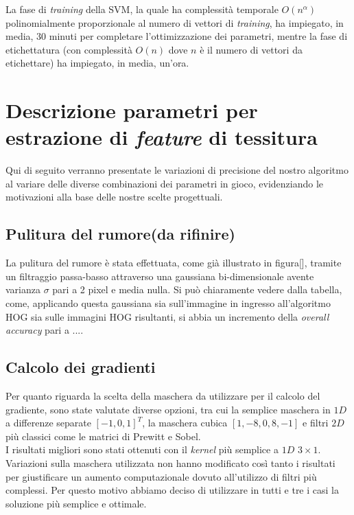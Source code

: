 La fase di \emph{training} della SVM, la quale ha complessità temporale $O(n^\alpha)$ polinomialmente proporzionale al numero di vettori di \emph{training}, ha impiegato, in media, 30 minuti per completare l'ottimizzazione dei parametri, mentre la fase di etichettatura (con complessità $O(n)$ dove $n$ è il numero di vettori da etichettare) ha impiegato, in media, un'ora.

%

\section{Descrizione parametri per estrazione di \emph{feature} di tessitura}
Qui di seguito verranno presentate le variazioni di precisione del nostro algoritmo al variare delle diverse combinazioni dei parametri in gioco, evidenziando le motivazioni alla base delle nostre scelte progettuali.

\subsection{Pulitura del rumore(da rifinire)}
La pulitura del rumore è stata effettuata, come già illustrato in figura[], tramite un filtraggio passa-basso attraverso una gaussiana bi-dimensionale avente varianza $\sigma$ pari a 2 pixel e media nulla. Si può chiaramente vedere dalla tabella, come, applicando questa gaussiana sia sull'immagine in ingresso all'algoritmo HOG sia sulle immagini HOG risultanti, si abbia un incremento della \emph{overall accuracy} pari a ....

\subsection{Calcolo dei gradienti}
Per quanto riguarda la scelta della maschera da utilizzare per il calcolo del gradiente, sono state valutate diverse opzioni, tra cui la semplice maschera in $1D$ a differenze separate $[-1, 0 ,1]^T$, la maschera cubica $[1,-8,0,8,-1]$ e filtri  $2D$ più classici come le matrici di Prewitt e Sobel.\\
I risultati migliori sono stati ottenuti con il \emph{kernel} più semplice a $1D$ $3\times1$. Variazioni sulla maschera utilizzata non hanno modificato così tanto i risultati per giustificare un aumento computazionale dovuto all'utilizzo di filtri più complessi. Per questo motivo abbiamo deciso di utilizzare in tutti e tre i casi la soluzione più semplice e ottimale.\\

